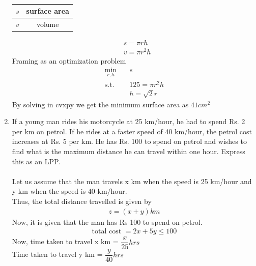 \documentclass[journal,12pt,twocolumn]{IEEEtran}
\renewcommand\thesection{\arabic{section}}
\begin{document}
\begin{enumerate}[label=\thesection.\arabic*.,ref=\thesection.\theenumi]
\begin{table}[ht]
{\begin{tabular}{ |c|c| }
 \hline
 $s$ & surface area \\
 \hline
  $v$ & volume \\
 \hline
\end{tabular}}
 \caption{}
 \end{table}
 \begin{align}
 &s = \pi r h \\
 &v = \pi r^2h
 \end{align}
Framing as an optimization problem\\
\begin{align}
\min_{r,h} \quad &s \nonumber\\
\textrm{s.t.} \quad & 125= \pi r^2h\nonumber\\
  &h = \sqrt{2}r    
\end{align}
By solving in cvxpy we get the minimum surface area as $41cm^2$
\item If a young man rides his motorcycle at 25 km/hour, he had to spend Rs. 2 per
km on petrol. If he rides at a faster speed of 40 km/hour, the petrol cost increases
at Rs. 5 per km. He has Rs. 100 to spend on petrol and wishes to find what is
the maximum distance he can travel within one hour. Express this as an LPP.\\
\solution\\
Let us assume that the man travels x km when the speed is 25 km/hour and y km when the speed is 40 km/hour.\\
Thus, the total distance travelled is given by
\begin{align}
z = (x + y) km
\end{align}
Now, it is given that the man has Rs 100 to spend on petrol.\\
\begin{align}
\text{total cost }= 2x + 5y \leq 100
\end{align}
Now, time taken to travel x km = $\dfrac{x}{25}hrs$\\

Time taken to travel y km = $\dfrac{y}{40}hrs$\\


\end{enumerate}
\end{document}
